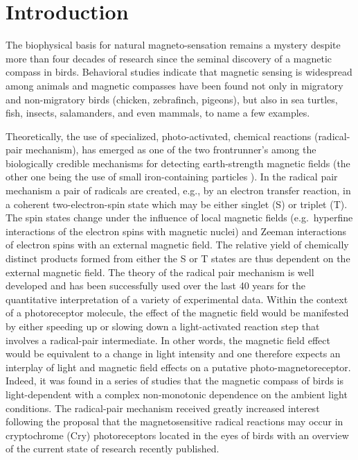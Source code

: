 \documentclass[twoside,twocolumn,9pt]{article}
\begin{document}


\section{Introduction}
The biophysical basis for natural magneto-sensation remains a mystery despite more than four decades of research since the seminal discovery of a magnetic compass in birds. \cite{Wiltschko72} Behavioral studies indicate that magnetic sensing is widespread among animals and magnetic compasses have been found not only in migratory and non-migratory birds (chicken, zebrafinch, pigeons), but also in sea turtles,\cite{Lohmann1991} fish,\cite{Quinn1980, Walker2006} insects, salamanders, and even mammals, \cite{Begall2013} to name a few examples.

Theoretically, the use of specialized, photo-activated, chemical reactions (radical-pair mechanism), has emerged as one of the two 
frontrunner's among the biologically credible mechanisms for detecting earth-strength magnetic fields (the other one being the use 
of small iron-containing particles \cite{Kirschvink1981}). In the radical pair mechanism \cite{Schulten1978} a pair of radicals 
are created, e.g., by an electron transfer reaction, in a coherent two-electron-spin state which may be either singlet (S) or 
triplet (T). The spin states change under the influence of local magnetic fields (e.g.\ hyperfine interactions of the electron 
spins with magnetic nuclei) and Zeeman interactions of electron spins with an external magnetic field. The relative yield of 
chemically distinct products formed from either the S or T states are thus dependent on the external magnetic field. The theory of 
the radical pair mechanism is well developed and has been successfully used over the last 40 years for the quantitative 
interpretation of a variety of experimental data. Within the context of a photoreceptor molecule, the effect of the magnetic field 
would be manifested by either speeding up or slowing down a light-activated reaction step that involves a radical-pair 
intermediate. In other words, the magnetic field effect would be equivalent to a change in light intensity and one therefore 
expects an interplay of light and magnetic field effects on a putative photo-magnetoreceptor. Indeed, it was found in a series of 
studies that the magnetic compass of birds is light-dependent with a complex non-monotonic dependence on the ambient light 
conditions. \cite{Johnsen2007, Wiltschko2016, Wiltschko2008} The radical-pair mechanism received greatly increased interest 
following the proposal that the magnetosensitive radical reactions may occur in cryptochrome (Cry) photoreceptors located in the 
eyes of birds \cite{Ritz2000} with an overview of the current state of research recently published. \cite{Hore2016} 
\end{document}
